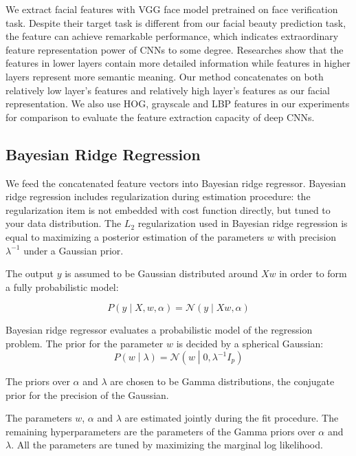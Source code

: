 \documentclass[a4paper,conference]{IEEEtran}
\begin{document}
    We extract facial features with VGG face model \cite{parkhi2015deep}
    pretrained on face verification task.
    Despite their target task is different from our facial
    beauty prediction task, the feature can achieve remarkable performance, which
    indicates extraordinary feature representation power of CNNs to some degree.
    Researches \cite{yosinski2014transferable} show that the features in lower
    layers contain more detailed information while features in higher layers
    represent more semantic meaning.
    Our method concatenates on
    both relatively low layer's features and relatively high layer's features as our
    facial representation.
    We also use HOG, grayscale and LBP features in our experiments for
    comparison to evaluate the feature extraction capacity of deep CNNs.

  \subsection{Bayesian Ridge Regression}
    We feed the concatenated feature vectors into Bayesian ridge regressor.
    Bayesian ridge regression includes regularization during estimation procedure:
    the regularization item is not embedded with cost function directly,
    but tuned to your data distribution. The $L_2$
    regularization used in Bayesian ridge regression is equal to maximizing
    a posterior estimation of the parameters $w$
    with precision $\lambda^{-1}$ under a Gaussian prior.

    The output $y$ is assumed to be Gaussian distributed around $Xw$
    in order to form a fully probabilistic model:

    \begin{equation}
      P\left(y\middle|X,w,\alpha\right)=\mathcal N\left(y\middle|Xw,\alpha\right)
    \end{equation}

    Bayesian ridge regressor evaluates a probabilistic model of the regression
    problem. The prior for the parameter $w$ is decided by a spherical Gaussian:
    \begin{equation}
      P\left(w\middle|\lambda\right)=\mathcal N\left(w\middle|0,\lambda^{-1}I_p\right)
    \end{equation}

    The priors over $\alpha$ and $\lambda$ are chosen to be Gamma distributions,
    the conjugate prior for the precision of the Gaussian.

    The parameters $w$, $\alpha$ and $\lambda$ are estimated jointly during the
    fit procedure. The remaining hyperparameters are the parameters of the
    Gamma priors over $\alpha$ and $\lambda$.
    All the parameters are tuned by maximizing the marginal log likelihood.
\end{document}

